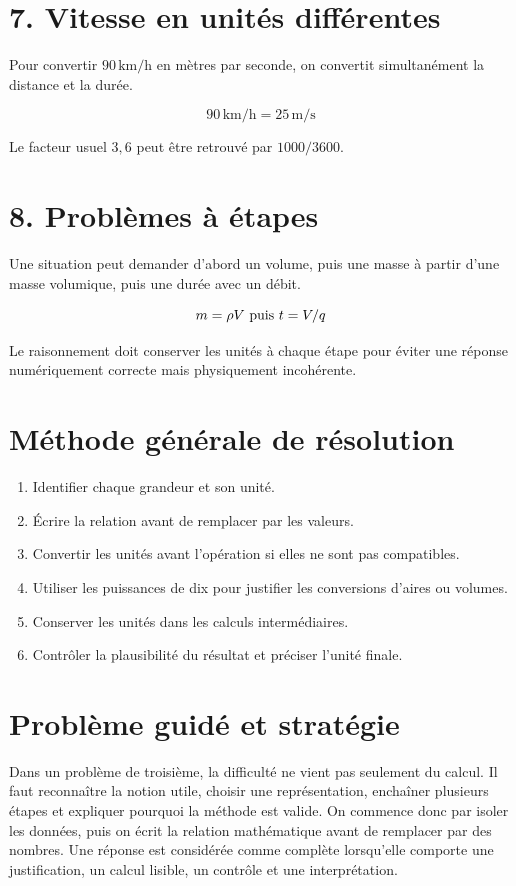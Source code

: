 \section{7. Vitesse en unités différentes}
Pour convertir $90\,\text{km/h}$ en mètres par seconde, on convertit simultanément la distance et la durée.

\[
90\,\text{km/h}=25\,\text{m/s}
\]

\begin{exemple}
Le facteur usuel $3{,}6$ peut être retrouvé par $1000/3600$.
\end{exemple}

\section{8. Problèmes à étapes}
Une situation peut demander d’abord un volume, puis une masse à partir d’une masse volumique, puis une durée avec un débit.

\[
m=\rho V$ puis $t=V/q
\]

\begin{exemple}
Le raisonnement doit conserver les unités à chaque étape pour éviter une réponse numériquement correcte mais physiquement incohérente.
\end{exemple}

\section{Méthode générale de résolution}
\begin{methode}
\begin{enumerate}
\item Identifier chaque grandeur et son unité.
\item Écrire la relation avant de remplacer par les valeurs.
\item Convertir les unités avant l’opération si elles ne sont pas compatibles.
\item Utiliser les puissances de dix pour justifier les conversions d’aires ou volumes.
\item Conserver les unités dans les calculs intermédiaires.
\item Contrôler la plausibilité du résultat et préciser l’unité finale.
\end{enumerate}
\end{methode}

\section{Problème guidé et stratégie}
Dans un problème de troisième, la difficulté ne vient pas seulement du calcul. Il faut reconnaître la notion utile, choisir une représentation, enchaîner plusieurs étapes et expliquer pourquoi la méthode est valide. On commence donc par isoler les données, puis on écrit la relation mathématique avant de remplacer par des nombres. Une réponse est considérée comme complète lorsqu’elle comporte une justification, un calcul lisible, un contrôle et une interprétation.

